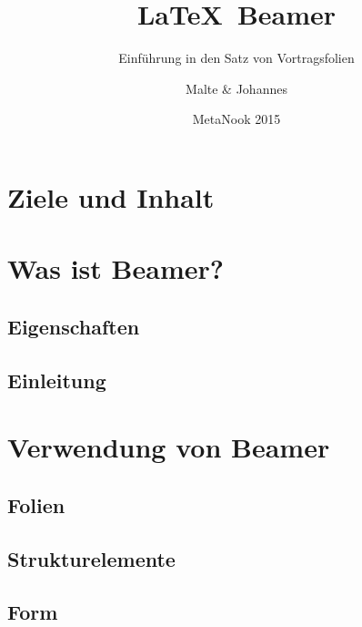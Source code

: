 \title{\LaTeX\ Beamer}
\subtitle{Einführung in den Satz von Vortragsfolien}
\author{Malte \& Johannes}
\date{MetaNook 2015}


  \section*{Ziele und Inhalt}

  \frame{}

  \section{Was ist Beamer?}

  \frame{}

  \subsection{Eigenschaften}

  \frame{}\frame{}\frame{}\frame{}

  \subsection{Einleitung}

  \frame{}\frame{}\frame{}

  \section{Verwendung von Beamer}

  \frame{}\frame{}\frame{}

  \subsection{Folien}

  \frame{}\frame{}\frame{}\frame{}\frame{}

  \subsection{Strukturelemente}

  \frame{}\frame{}\frame{}

  \subsection{Form}

  \frame{}\frame{}

